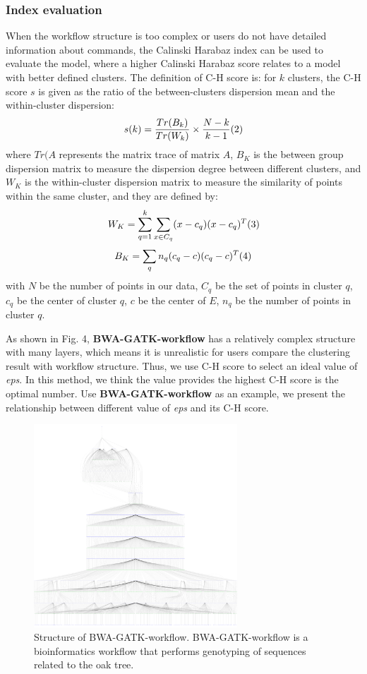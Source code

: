 \documentclass[conference]{IEEEtran}
\begin{document}
\subsubsection{Index evaluation}
When the workflow structure is too complex or users do not have detailed information about commands, the Calinski Harabaz index can be used to evaluate the model, where a higher Calinski Harabaz score relates to a model with better defined clusters. The definition of C-H score is: for $k$ clusters, the C-H score $s$ is given as the ratio of the between-clusters dispersion mean and the within-cluster dispersion:
$$
s(k)=\frac{Tr(B_k)}{Tr(W_k)}\times\frac{N-k}{k-1}\relax{(2)}
$$
where ${Tr(A}$ represents the matrix trace of matrix $A$, $B_K$ is the between group dispersion matrix to measure the dispersion degree between different clusters, and $W_K$ is the within-cluster dispersion matrix to measure the similarity of points within the same cluster, and they are defined by:
$$
W_K=\sum_{q=1}^{k}\sum_{x\in{C_q}}(x-c_q)(x-c_q)^T\relax{(3)}
$$
$$
B_K=\sum_{q}n_q(c_q-c)(c_q-c)^T\relax{(4)}
$$
with $N$ be the number of points in our data, $C_q$ be the set of points in cluster $q$, $c_q$ be the center of cluster $q$, $c$ be the center of $E$, $n_q$ be the number of points in cluster $q$.

As shown in Fig. 4, \textbf{BWA-GATK-workflow} has a relatively complex structure with many layers, which means it is unrealistic for users compare the clustering result with workflow structure. Thus, we use C-H score to select an ideal value of \emph{eps}. In this method, we think the value provides the highest C-H score is the optimal number. Use \textbf{BWA-GATK-workflow} as an example, we present the relationship between different value of \emph{eps} and its C-H score.

\begin{figure}[htbp]
\centering
\includegraphics[width=3in]{./bwa-gatkworkflow.png} 
\caption{Structure of BWA-GATK-workflow. BWA-GATK-workflow is a bioinformatics workflow that performs genotyping of sequences related to the oak tree.}
\end{figure}
\end{document}
